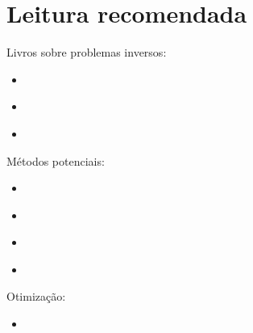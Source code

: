 \chapter{Leitura recomendada}

\noindent 
Livros sobre problemas inversos:

\begin{itemize}
\item \cite{tarantola}
\item \cite{menke}
\item \cite{aster}
\end{itemize}

\noindent
Métodos potenciais:

\begin{itemize}
\item \cite{silva_etal2001}
\item \cite{medeiros&silva1996}
\item \cite{martins_etal2011}
\item \cite{barbosa&silva2011}
\end{itemize}

\noindent
Otimização:

\begin{itemize}
\item \cite{kelley}
\end{itemize}

